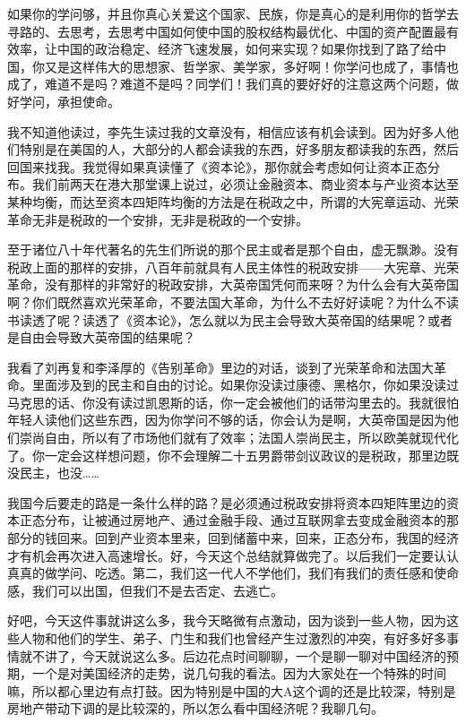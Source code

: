 \documentclass[UTF8, 12pt, a4paper]{ctexrep}
\begin{document}
如果你的学问够，并且你真心关爱这个国家、民族，你是真心的是利用你的哲学去寻路的、去思考，去思考中国如何使中国的股权结构最优化、中国的资产配置最有效率，让中国的政治稳定、经济飞速发展，如何来实现？如果你找到了路了给中国，你又是这样伟大的思想家、哲学家、美学家，多好啊！你学问也成了，事情也成了，难道不是吗？难道不是吗？同学们！我们真的要好好的注意这两个问题，做好学问，承担使命。

我不知道他读过，李先生读过我的文章没有，相信应该有机会读到。因为好多人他们特别是在美国的人，大部分的人都会读我的东西，好多朋友都读我的东西，然后回国来找我。我觉得如果真读懂了《资本论》，那你就会考虑如何让资本正态分布。我们前两天在港大那堂课上说过，必须让金融资本、商业资本与产业资本达至某种均衡，而达至资本四矩阵均衡的方法是在税政之中，所谓的大宪章运动、光荣革命无非是税政的一个安排，无非是税政的一个安排。

至于诸位八十年代著名的先生们所说的那个民主或者是那个自由，虚无飘渺。没有税政上面的那样的安排，八百年前就具有人民主体性的税政安排——大宪章、光荣革命，没有那样的非常好的税政安排，大英帝国凭何而来呀？为什么会有大英帝国啊？你们既然喜欢光荣革命，不要法国大革命，为什么不去好好读呢？为什么不读书读透了呢？读透了《资本论》，怎么就以为民主会导致大英帝国的结果呢？或者是自由会导致大英帝国的结果呢？

我看了刘再复和李泽厚的《告别革命》里边的对话，谈到了光荣革命和法国大革命。里面涉及到的民主和自由的讨论。如果你没读过康德、黑格尔，你如果没读过马克思的话、你没有读过凯恩斯的话，你一定会被他们的话带沟里去的。我就很怕年轻人读他们这些东西，因为你学问不够的话，你会认为是啊，大英帝国是因为他们崇尚自由，所以有了市场他们就有了效率；法国人崇尚民主，所以欧美就现代化了。你一定会这样想问题，你不会理解二十五男爵带剑议政议的是税政，那里边既没民主，也没……

我国今后要走的路是一条什么样的路？是必须通过税政安排将资本四矩阵里边的资本正态分布，让被通过房地产、通过金融手段、通过互联网拿去变成金融资本的那部分的钱回来。回到产业资本里来，回到储蓄中来，回来，正态分布，我国的经济才有机会再次进入高速增长。好，今天这个总结就算做完了。以后我们一定要认认真真的做学问、吃透。第二，我们这一代人不学他们，我们有我们的责任感和使命感，我们可以出国，但我们不是去否定、去逃亡。

好吧，今天这件事就讲这么多，我今天略微有点激动，因为谈到一些人物，因为这些人物和他们的学生、弟子、门生和我们也曾经产生过激烈的冲突，有好多好多事情就不讲了，今天就说这么多。后边花点时间聊聊，一个是聊一聊对中国经济的预期，一个是对美国经济的走势，说几句我的看法。因为大家处在一个特殊的时间嘛，所以都心里边有点打鼓。因为特别是中国的大A这个调的还是比较深，特别是房地产带动下调的是比较深的，所以怎么看中国经济呢？我聊几句。
\end{document}
